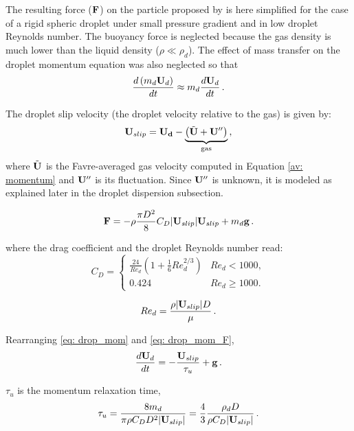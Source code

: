The resulting force ($\mathbf{F}$) on the particle  proposed by \cite{vonkarman} is here
simplified for the case of a rigid spheric droplet under small pressure
gradient and in low droplet Reynolds number. The buoyancy force is
neglected because the gas density is much lower than the liquid density ($\rho \ll \rho_d $).  The effect of mass transfer on the droplet momentum equation was also neglected so that
\begin{equation}
 \frac{d \left(m_d \mathbf{U}_d \right) }{dt}\approx  m_d\frac{d \mathbf{U}_d }{dt} \, .
\end{equation}


The droplet slip velocity (the droplet velocity relative to the gas) is given by:
\begin{equation}\label{eq: Urel}
 \bv{U}_{slip} = \bv{U_d} - \underbrace{\left( \tilde{\bv{U}}+\bv{U}'' \right)}_{\text{gas}} \, ,
\end{equation}
where $\tilde{\mathbf{U}}$ is the Favre-averaged gas velocity computed in Equation \eqref{av: momentum} and $\mathbf{U}''$ is its fluctuation.
Since $\mathbf{U}''$ is unknown, it is modeled as explained later in the droplet dispersion subsection.


\begin{equation}\label{eq: drop_mom_F}
 \bv{F}=-\rho\frac{\pi D^2}{8}C_D | \bv{U}_{slip}| \bv{U}_{slip}
+ m_d \bv{g} \, .
\end{equation}

where the drag coefficient and the droplet Reynolds number read:
\begin{equation}
 C_D =\begin{cases}
\frac{24}{Re_d} \left( 1 + \frac{1}{6} Re^{2/3}_d \right) & Re_d < 1000,\\
0.424 & Re_d \geq 1000.
\end{cases}
\end{equation}

\begin{equation}
 Re_d = \frac{\rho | \mathbf{U}_{slip}| D}{\mu} \, .
\end{equation}

Rearranging \eqref{eq: drop_mom} and \eqref{eq: drop_mom_F},
\begin{equation}\label{eq: drop_dudt}
 \frac{d\bv{U}_d}{dt} = -\frac{ \bv{U}_{slip}}{\tau_{u}} + \bv{g} \, .
\end{equation}

$\tau_u$ is the momentum relaxation time,
\begin{equation}
 \tau_u = \frac{8 m_d}{\pi \rho C_D D^2 | \mathbf{U}_{slip}|}=\frac{4}{3}
\frac{\rho_d D}{\rho C_D | \mathbf{U}_{slip}|} \, .
\end{equation}


